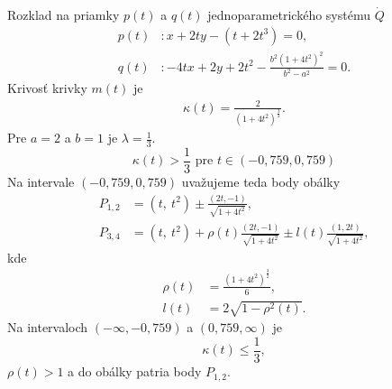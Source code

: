 \begin{example}[Parabola]
Rozklad na priamky $p(t)$ a $q(t)$ jednoparametrického systému $\dot{Q}$  
\begin{align*}
p(t)& \colon x+2ty - \left(t + 2t^{3}\right)=0, \\
q(t)& \colon -4tx+2y+2t^{2}-\frac{b^{2}\left(1+4t^{2}\right)^{2}}{b^{2}-a^{2}}=0.
\end{align*}
Krivosť krivky $m(t)$ je
\begin{align*}
\kappa(t) = \frac{2}{\left(1+4t^{2}\right)^{\frac{3}{2}}}.
\end{align*}
Pre $a=2$ a $b=1$ je $\lambda = \frac{1}{3}$.
$$
\kappa(t) > \frac{1}{3} \text{ pre } t \in (-0,759,0,759)
$$
Na intervale $(-0,759,0,759)$ uvažujeme teda body obálky
\begin{align*}
P_{1,2} &= \left(t,\ t^{2}\right)\pm \frac{\left(2t,-1\right)}{\sqrt{1+4t^{2}}}, \\
P_{3,4} &= \left(t,\ t^{2}\right)+ \rho(t)\frac{\left(2t,-1\right)}{\sqrt{1+4t^{2}}} \pm l(t) \frac{\left(1,2t\right)}{\sqrt{1+4t^{2}}},
\end{align*}
kde 
\begin{align*}
\rho(t) &= \frac{\left(1+4t^{2}\right)^{\frac{3}{2}}}{6}, \\
l(t) &= 2 \sqrt{1 -\rho^{2}(t)}.
\end{align*}
Na intervaloch $(-\infty, -0,759) $ a $(0,759, \infty)$ je 
$$
\kappa(t) \leq \frac{1}{3},
$$
$\rho(t) > 1$ a do obálky patria body $P_{1,2}.$ 
\end{example}

